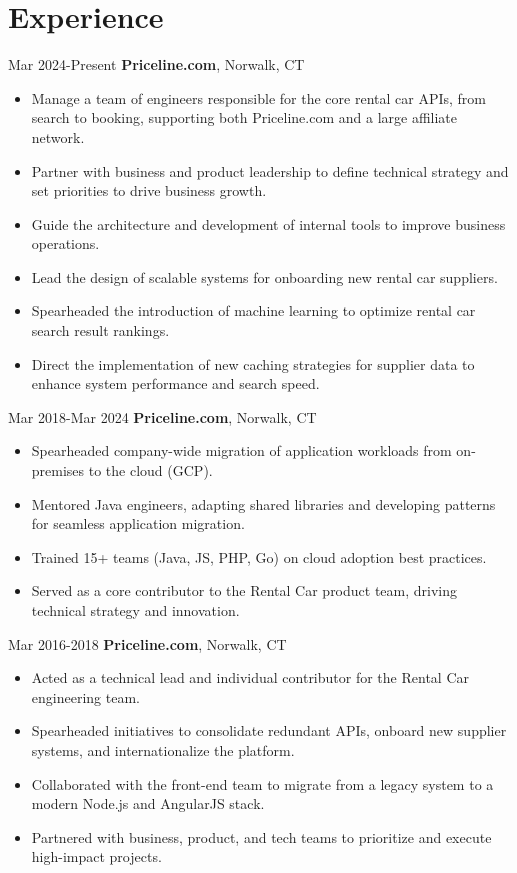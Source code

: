 \documentclass[a4paper,online]{adcv}
\begin{document}
	\section{Experience}
	\begin{adcvtabletwo}
		 {Mar 2024-Present}
		{\textbf{Priceline.com}, Norwalk, CT}
		\begin{itemize}
			\item Manage a team of engineers responsible for the core rental car APIs, from search to booking, supporting both Priceline.com and a large affiliate network.
			\item Partner with business and product leadership to define technical strategy and set priorities to drive business growth.
			\item Guide the architecture and development of internal tools to improve business operations.
			\item Lead the design of scalable systems for onboarding new rental car suppliers.
			\item Spearheaded the introduction of machine learning to optimize rental car search result rankings.
			\item Direct the implementation of new caching strategies for supplier data to enhance system performance and search speed.
		\end{itemize}
		\adcvrowskip
		\adcvrowskip
		
		 {Mar 2018-Mar 2024}
		{\textbf{Priceline.com}, Norwalk, CT}
		\begin{itemize}
			\item Spearheaded company-wide migration of application workloads from on-premises to the cloud (GCP).
			\item Mentored Java engineers, adapting shared libraries and developing patterns for seamless application migration.
			\item Trained 15+ teams (Java, JS, PHP, Go) on cloud adoption best practices.
			\item Served as a core contributor to the Rental Car product team, driving technical strategy and innovation.
		\end{itemize}
		
		\adcvrowskip
		\adcvrowskip
		 {Mar 2016-2018}
		{\textbf{Priceline.com}, Norwalk, CT}
		\begin{itemize}
			\item Acted as a technical lead and individual contributor for the Rental Car engineering team.
			\item Spearheaded initiatives to consolidate redundant APIs, onboard new supplier systems, and internationalize the platform.
			\item Collaborated with the front-end team to migrate from a legacy system to a modern Node.js and AngularJS stack.
			\item Partnered with business, product, and tech teams to prioritize and execute high-impact projects.
		\end{itemize}
		\adcvrowskip
		

\end{adcvtabletwo}
\end{document}
